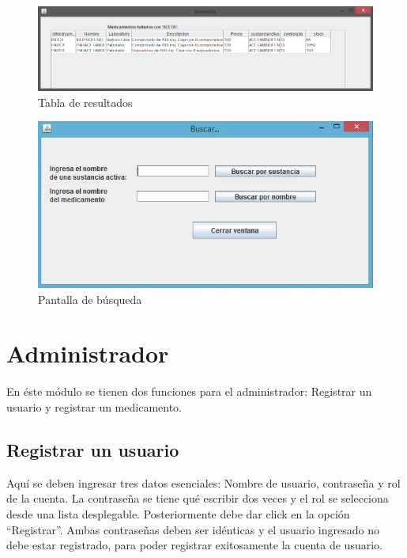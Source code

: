 \begin{figure}[htbp!]
		\centering		
	\end{figure}
\begin{figure}[htbp!]
\centering
		\includegraphics[width=.9\textwidth]{images/gui/IUResultados}
		\caption{Tabla de resultados}
\end{figure}
\begin{figure}[htbp!]
		\centering		
	\end{figure}
\begin{figure}[htbp!]
\centering
		\includegraphics[width=.7\textwidth]{images/gui/IUBusqueda}
		\caption{Pantalla de b\'usqueda}
\end{figure}



\section{Administrador}
En \'este m\'odulo se tienen dos funciones para el administrador: Registrar un usuario y registrar un medicamento.

\subsection{Registrar un usuario}
Aqu\'i se deben ingresar tres datos esenciales: Nombre de usuario, contraseña y rol de la cuenta. La contraseña se tiene qu\'e escribir dos veces y el rol se selecciona desde una lista desplegable. Posteriormente debe dar click en la opci\'on "`Registrar"'. Ambas contraseñas deben ser id\'enticas y el usuario ingresado no debe estar registrado, para poder registrar exitosamente la cuenta de usuario.


